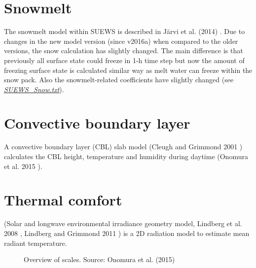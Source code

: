 \documentclass[letterpaper,10pt,english]{sphinxmanual}
\begin{document}
\section{Snowmelt}
\label{\detokenize{parameterisations-and-sub-models:snowmelt}}
The snowmelt model within SUEWS is described in Järvi et al.
(2014) \label{\detokenize{parameterisations-and-sub-models:id19}}{\hyperref[\detokenize{references:leena2014}]{\sphinxcrossref{{[}Leena2014{]}}}}. Due to changes in the new model version (since v2016a)
when compared to the older versions, the snow calculation has slightly
changed. The main difference is that previously all surface state could
freeze in 1-h time step but now the amount of freezing surface state is
calculated similar way as melt water can freeze within the snow pack.
Also the snowmelt-related coefficients have slightly changed (see
{\hyperref[\detokenize{parameterisations-and-sub-models:SUEWS_Snow.txt}]{\emph{SUEWS\_Snow.txt}}}).


\section{Convective boundary layer}
\label{\detokenize{parameterisations-and-sub-models:convective-boundary-layer}}
A convective boundary layer (CBL) slab model (Cleugh and Grimmond
2001 \label{\detokenize{parameterisations-and-sub-models:id20}}{\hyperref[\detokenize{references:cg2001}]{\sphinxcrossref{{[}CG2001{]}}}}) calculates the CBL height, temperature and humidity during
daytime (Onomura et al. 2015 \label{\detokenize{parameterisations-and-sub-models:id21}}{\hyperref[\detokenize{references:shiho2015}]{\sphinxcrossref{{[}Shiho2015{]}}}}).


\section{Thermal comfort}
\label{\detokenize{parameterisations-and-sub-models:thermal-comfort}}
 (Solar and longwave environmental irradiance geometry model,
Lindberg et al. 2008 \label{\detokenize{parameterisations-and-sub-models:id22}}{\hyperref[\detokenize{references:fl2008}]{\sphinxcrossref{{[}FL2008{]}}}}, Lindberg and Grimmond 2011 \label{\detokenize{parameterisations-and-sub-models:id23}}{\hyperref[\detokenize{references:fl2011}]{\sphinxcrossref{{[}FL2011{]}}}}) is a 2D
radiation model to estimate mean radiant temperature.

\begin{figure}[htbp]
\centering
\capstart

\noindent{}
\caption{Overview of scales. Source: Onomura et al. (2015) \label{\detokenize{parameterisations-and-sub-models:id24}}{\hyperref[\detokenize{references:shiho2015}]{\sphinxcrossref{{[}Shiho2015{]}}}}}\label{\detokenize{parameterisations-and-sub-models:id25}}\end{figure}
\end{document}
